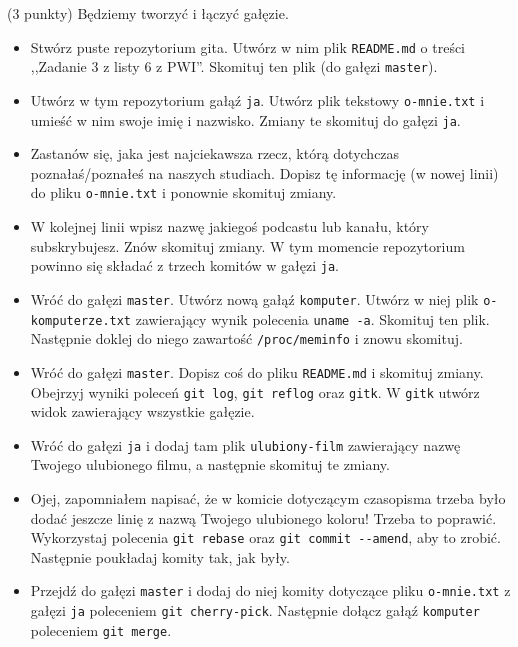 \begin{zadanie} (3 punkty) Będziemy tworzyć i łączyć gałęzie.
\begin{itemize} 
\item 
Stwórz puste repozytorium gita.
Utwórz w nim plik \verb+README.md+ o treści ,,Zadanie 3 z listy 6 z PWI''. Skomituj ten plik (do gałęzi \verb+master+).

\item Utwórz w tym repozytorium gałąź \verb+ja+. Utwórz plik tekstowy \verb+o-mnie.txt+ i umieść w nim swoje imię i nazwisko. Zmiany te skomituj do gałęzi \verb+ja+.

\item Zastanów się, jaka jest najciekawsza rzecz, którą dotychczas poznałaś/poznałeś na naszych studiach. Dopisz tę informację (w nowej linii) do pliku \verb+o-mnie.txt+ i ponownie skomituj zmiany.

\item W kolejnej linii wpisz nazwę jakiegoś podcastu lub kanału, który subskrybujesz. Znów skomituj zmiany. W tym momencie repozytorium powinno się składać z trzech komitów w gałęzi \verb+ja+. 

\item  Wróć do gałęzi \verb+master+. Utwórz nową gałąź \verb+komputer+. Utwórz w niej plik \verb+o-komputerze.txt+ zawierający wynik polecenia \verb+uname -a+. Skomituj ten plik. Następnie doklej do niego zawartość \verb+/proc/meminfo+ i znowu skomituj.

\item Wróć do gałęzi \verb+master+. Dopisz coś do pliku \verb+README.md+ i skomituj zmiany. Obejrzyj wyniki poleceń  \verb+git log+, \verb+git reflog+ oraz \verb+gitk+. W \verb+gitk+ utwórz widok zawierający wszystkie gałęzie.

\item Wróć do gałęzi \verb+ja+ i dodaj tam plik \verb+ulubiony-film+ zawierający nazwę Twojego ulubionego filmu, a następnie skomituj te zmiany.

\item Ojej, zapomniałem napisać, że w komicie dotyczącym czasopisma trzeba było dodać jeszcze linię z nazwą Twojego ulubionego koloru! Trzeba to poprawić. Wykorzystaj polecenia \verb+git rebase+ oraz \verb+git commit --amend+, aby to zrobić. Następnie poukładaj komity tak, jak były.

\item Przejdź do gałęzi \verb+master+ i dodaj do niej komity dotyczące pliku \verb+o-mnie.txt+ z gałęzi \verb+ja+ poleceniem \verb+git cherry-pick+. Następnie dołącz gałąź \verb+komputer+ poleceniem \verb+git merge+.


\end{itemize}
\end{zadanie}
